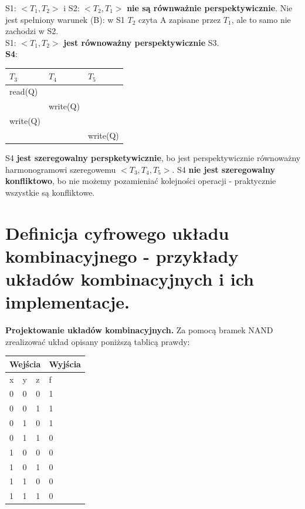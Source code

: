 \documentclass[12pt]{article}
\begin{document}
    S1: $<T_1, T_2>$ i S2: $<T_2, T_1>$ \textbf{nie są równważnie perspektywicznie}. Nie jest spełniony warunek (B):
    w S1 $T_2$ czyta A zapisane przez $T_1$, ale to samo nie zachodzi w S2.\\

    S1: $<T_1, T_2>$ \textbf{jest równoważny perspektywicznie} S3.\\

    \noindent \textbf{S4}:
    \begin{table}[H]
        \begin{center}
            \begin{tabular}{| p{4cm} | p{4cm} | p{4cm} |}
                \hline
                $T_3$ & $T_4$ & $T_5$\\
                \hline
                \hline
                read(Q) &&\\
                \hline
                & write(Q) &\\
                \hline
                write(Q) &&\\
                \hline
                && write(Q)\\
                \hline
            \end{tabular}
        \end{center}
    \end{table}

    S4 \textbf{jest szeregowalny perspketywicznie}, bo jest perspektywicznie równoważny harmonogramowi szeregowemu
    $<T_3, T_4, T_5>$. S4 \textbf{nie jest szeregowalny konfliktowo}, bo nie możemy pozamieniać kolejności operacji
    - praktycznie wszystkie są konfliktowe.

    \newpage

    \section{Definicja cyfrowego układu kombinacyjnego - przykłady układów kombinacyjnych i ich implementacje.}

    \begin{exercise}
        \textbf{Projektowanie układów kombinacyjnych.} Za pomocą bramek NAND zrealizować układ opisany poniższą tablicą
        prawdy:

        \begin{tabular}{| p{1cm} p{1cm} p{1cm} | p{2cm} |}
            \hline
            \multicolumn{3}{|c|}{Wejścia} & Wyjścia\\
            \hline
            x & y & z & f\\
            \hline
            0 & 0 & 0 & 1\\
            0 & 0 & 1 & 1\\
            0 & 1 & 0 & 1\\
            0 & 1 & 1 & 0\\
            1 & 0 & 0 & 0\\
            1 & 0 & 1 & 0\\
            1 & 1 & 0 & 0\\
            1 & 1 & 1 & 0\\
            \hline
        \end{tabular}
    \end{exercise}
\end{document}
